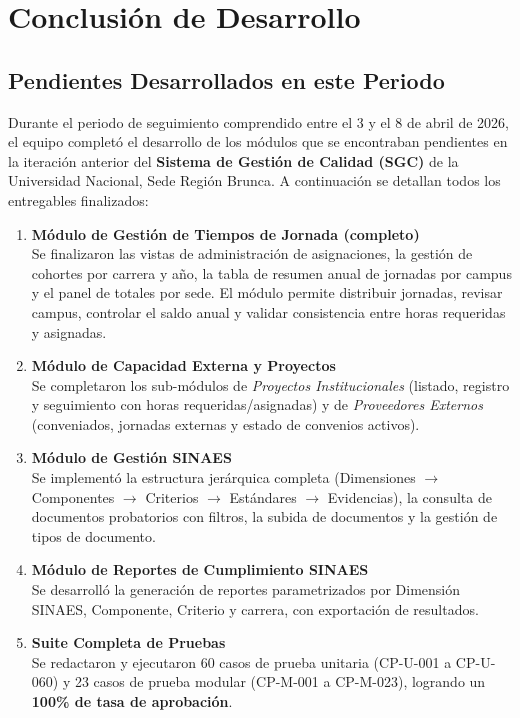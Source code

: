\section{Conclusión de Desarrollo}

\subsection{Pendientes Desarrollados en este Periodo}

Durante el periodo de seguimiento comprendido entre el 3 y el 8 de abril de 2026, el equipo completó el desarrollo de los módulos que se encontraban pendientes en la iteración anterior del \textbf{Sistema de Gestión de Calidad (SGC)} de la Universidad Nacional, Sede Región Brunca. A continuación se detallan todos los entregables finalizados:

\begin{enumerate}

  \item \textbf{Módulo de Gestión de Tiempos de Jornada (completo)} \\
  Se finalizaron las vistas de administración de asignaciones, la gestión de cohortes por carrera y año, la tabla de resumen anual de jornadas por campus y el panel de totales por sede. El módulo permite distribuir jornadas, revisar campus, controlar el saldo anual y validar consistencia entre horas requeridas y asignadas.

  \item \textbf{Módulo de Capacidad Externa y Proyectos} \\
  Se completaron los sub-módulos de \textit{Proyectos Institucionales} (listado, registro y seguimiento con horas requeridas/asignadas) y de \textit{Proveedores Externos} (conveniados, jornadas externas y estado de convenios activos).

  \item \textbf{Módulo de Gestión SINAES} \\
  Se implementó la estructura jerárquica completa (Dimensiones $\to$ Componentes $\to$ Criterios $\to$ Estándares $\to$ Evidencias), la consulta de documentos probatorios con filtros, la subida de documentos y la gestión de tipos de documento.

  \item \textbf{Módulo de Reportes de Cumplimiento SINAES} \\
  Se desarrolló la generación de reportes parametrizados por Dimensión SINAES, Componente, Criterio y carrera, con exportación de resultados.

  \item \textbf{Suite Completa de Pruebas} \\
  Se redactaron y ejecutaron 60 casos de prueba unitaria (CP-U-001 a CP-U-060) y 23 casos de prueba modular (CP-M-001 a CP-M-023), logrando un \textbf{100\% de tasa de aprobación}.

\end{enumerate}

